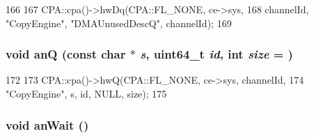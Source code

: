 \begin{DoxyCode}
166         {
167             CPA::cpa()->hwDq(CPA::FL_NONE, ce->sys,
168                       channelId, "CopyEngine", "DMAUnusedDescQ", channelId);
169         }
\end{DoxyCode}
\hypertarget{classCopyEngine_1_1CopyEngineChannel_aa754a1b36810cef759e3c709a3d941e3}{
\subsubsection[{anQ}]{\setlength{\rightskip}{0pt plus 5cm}void anQ (const char $\ast$ {\em s}, \/  uint64\_\-t {\em id}, \/  int {\em size} = {})}}
\label{classCopyEngine_1_1CopyEngineChannel_aa754a1b36810cef759e3c709a3d941e3}



\begin{DoxyCode}
172         {
173             CPA::cpa()->hwQ(CPA::FL_NONE, ce->sys, channelId,
174                     "CopyEngine", s, id, NULL, size);
175         }
\end{DoxyCode}
\hypertarget{classCopyEngine_1_1CopyEngineChannel_a34885371096072728525cff5eaae0c8c}{
\subsubsection[{anWait}]{\setlength{\rightskip}{0pt plus 5cm}void anWait ()}}
\label{classCopyEngine_1_1CopyEngineChannel_a34885371096072728525cff5eaae0c8c}



